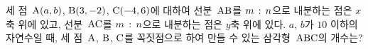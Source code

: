 세 점~$\mathrm{A}(a{,}\mkern3mu\mathopen{}b)$, $\mathrm{B}(3{,}\mkern3mu\mathopen{}-2)$, $\mathrm{C}(-4{,}\mkern3mu\mathopen{}6)$에 대하여 선분~$\mathrm{AB}$를 $m\mkern3mu :\mkern3mu n$으로 내분하는 점은 $x$축 위에 있고, 선분~$\mathrm{AC}$를 $m\mkern3mu :\mkern3mu n$으로 내분하는 점은 $y$축 위에 있다. $a$, $b$가 $10$ 이하의 자연수일 때, 세 점~$\mathrm{A}$, $\mathrm{B}$, $\mathrm{C}$를 꼭짓점으로 하여 만들 수 있는 삼각형~$\mathrm{ABC}$의 개수는? 
